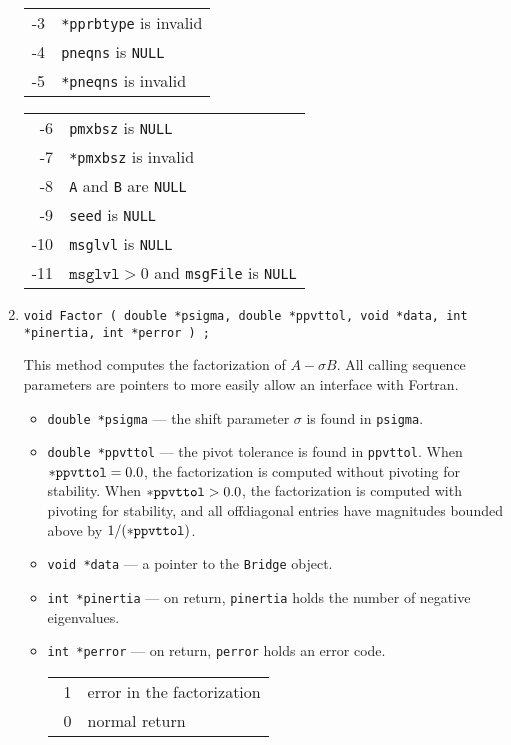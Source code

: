 \begin{enumerate}
\begin{center}
\begin{tabular}[t]{rl}
-3 & \texttt{*pprbtype} is invalid \\
-4 & \texttt{pneqns} is \texttt{NULL} \\
-5 & \texttt{*pneqns} is invalid
\end{tabular}
\begin{tabular}[t]{rl}
-6 & \texttt{pmxbsz} is \texttt{NULL} \\
-7 & \texttt{*pmxbsz} is invalid \\
-8 & \texttt{A} and \texttt{B} are \texttt{NULL} \\
-9 & \texttt{seed} is \texttt{NULL} \\
-10 & \texttt{msglvl} is \texttt{NULL} \\
-11 & $\texttt{msglvl} > 0$ and \texttt{msgFile} is \texttt{NULL}
\end{tabular}
\end{center}
\item
\begin{verbatim}
void Factor ( double *psigma, double *ppvttol, void *data, int *pinertia, int *perror ) ;
\end{verbatim}
This method computes the factorization of $A - \sigma B$.
All calling sequence parameters are pointers to more
easily allow an interface with Fortran.
\begin{itemize}
\item {\tt double *psigma} --- the shift parameter $\sigma$ is
      found in {\tt *psigma}.
\item {\tt double *ppvttol} --- the pivot tolerance is
      found in {\tt *ppvttol}. When ${\tt *ppvttol} = 0.0$, 
      the factorization is computed without pivoting for stability.
      When ${\tt *ppvttol} > 0.0$, the factorization is computed 
      with pivoting for stability, and all offdiagonal entries 
      have magnitudes bounded above by $1/({\tt *ppvttol})$.
\item {\tt void *data} --- a pointer to the {\tt Bridge} object.
\item {\tt int *pinertia} --- on return, {\tt *pinertia} holds the 
      number of negative eigenvalues.
\item {\tt int *perror} --- on return, {\tt *perror} holds an
      error code.
      \begin{center}
      \begin{tabular}[t]{rl}
      ~1 & error in the factorization \\
      ~0 & normal return \\

\end{tabular}
\end{center}
\end{itemize}
\end{enumerate}
